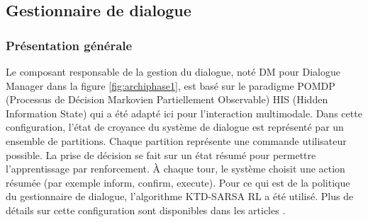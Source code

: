 \documentclass[a4paper,11pt,twoside]{StyleThese}
\begin{document}


\subsection{Gestionnaire de dialogue}
\subsubsection{Présentation générale}
Le composant responsable de la gestion du dialogue, noté DM pour Dialogue Manager dans la figure \ref{fig:archiphase1}, est basé sur le paradigme POMDP (Processus de Décision Markovien Partiellement Observable) HIS (Hidden Information State) \cite{Young10} qui a été adapté ici pour l'interaction multimodale. Dans cette configuration, l'état de croyance du système de dialogue est représenté par un ensemble de partitions. Chaque partition représente une commande utilisateur possible. La prise de décision se fait sur un état résumé pour permettre l'apprentissage par renforcement. À chaque tour, le système choisit une action résumée (par exemple inform, confirm, execute).
Pour ce qui est de la politique du gestionnaire de dialogue, l'algorithme KTD-SARSA RL \cite{Daubigney12} a été utilisé. Plus de détails sur cette configuration sont disponibles dans les articles \cite{Ferreira13a,Ferreira13b}.
\end{document}
